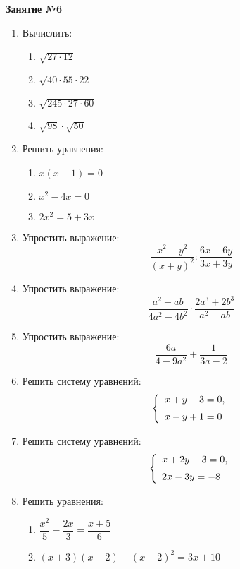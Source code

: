 \documentclass[12pt, a4paper]{article}
\begin{document}
	
	   \cfoot{}
	\begin{center}
		\Large
		\textbf{Занятие №6}
	\end{center}
	\begin{enumerate}
		\item Вычислить:
		\begin{multicols}{2}
			\begin{enumerate}[label=\asbuk*)]
				\item $\sqrt{27\cdot12}$
				\item $\sqrt{40\cdot55\cdot22}$
				\item $\sqrt{245\cdot27\cdot60}$
				\item $\sqrt{98}\cdot\sqrt{50}$
			\end{enumerate}
		\end{multicols}
		\item Решить уравнения:
		\begin{multicols}{2}
			\begin{enumerate}[label=\asbuk*)]
				\item $x(x-1)=0$
				\item $x^2-4x=0$
				\item $2x^2=5+3x$
			\end{enumerate}
		\end{multicols}
		\item Упростить выражение: $$\dfrac{x^2-y^2}{(x+y)^2}:\dfrac{6x-6y}{3x+3y}$$
		\item Упростить выражение: $$\dfrac{a^2+ab}{4a^2-4b^2}\cdot\dfrac{2a^3+2b^3}{a^2-ab}$$
		\item Упростить выражение: $$\dfrac{6a}{4-9a^2}+\dfrac{1}{3a-2}$$
		\item Решить систему уравнений:
		$$\left\{
		\begin{array}{l}
			x+y-3=0,\vspace{0,2cm}\\
			x-y+1=0
		\end{array}
		\right.$$
		\item Решить систему уравнений:
		$$\left\{
		\begin{array}{l}
			x+2y-3=0,\vspace{0,2cm}\\
			2x-3y=-8
		\end{array}
		\right.$$
		\item Решить уравнения:
		\begin{enumerate}[label=\asbuk*)]
			\item $\dfrac{x^2}{5}-\dfrac{2x}{3}=\dfrac{x+5}{6}$
			\item $(x+3)(x-2)+(x+2)^2=3x+10$
		\end{enumerate}
	\end{enumerate}
\end{document}
